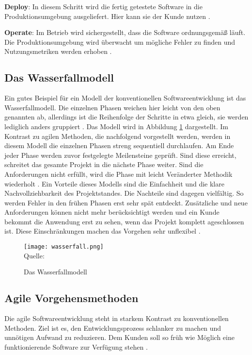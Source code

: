 \textbf{Deploy}: In diesem Schritt wird die fertig getestete Software in die Produktionsumgebung
ausgeliefert. Hier kann sie der Kunde nutzen \cite{Halstenberg2020}.

\textbf{Operate}: Im Betrieb wird sichergestellt, dass die Software ordnungsgemäß läuft.
Die Produktionsumgebung wird überwacht um mögliche Fehler zu finden und Nutzungsmetriken werden
erhoben \cite{Halstenberg2020}.

\subsection{Das Wasserfallmodell}

Ein gutes Beispiel für ein Modell der konventionellen Softwareentwicklung ist
das Wasserfallmodell. Die einzelnen Phasen weichen hier leicht von den oben genannten
ab, allerdings ist die Reihenfolge der Schritte in etwa gleich, sie werden lediglich
anders gruppiert \cite{DietmarAbts2017}. Das Modell wird in Abbildung \ref{fig:wasserfall} dargestellt.
Im Kontrast zu agilen Methoden, die nachfolgend vorgestellt werden, werden in diesem
Modell die einzelnen Phasen streng sequentiell durchlaufen. Am Ende jeder Phase werden 
zuvor festgelegte Meilensteine geprüft. Sind diese erreicht, schreitet das gesamte Projekt
in die nächste Phase weiter. Sind die Anforderungen nicht erfüllt, wird die Phase mit leicht
Veränderter Methodik wiederholt \cite{DietmarAbts2017}.
Ein Vorteile dieses Modells sind die Einfachheit und die klare Nachvollziehbarkeit
des Projektstandes.
Die Nachteile sind dagegen vielfältig. So werden Fehler in den frühen Phasen erst sehr
spät entdeckt. Zusätzliche und neue Anforderungen können nicht mehr berücksichtigt werden
und ein Kunde bekommt die Anwendung erst zu sehen, wenn das Projekt komplett ageschlossen ist.
Diese Einschränkungen machen das Vorgehen sehr unflexibel \cite{DietmarAbts2017}.

\begin{figure}[H]
    \centering
    \caption{Das Wasserfallmodell}
	\label{fig:wasserfall}
    \texttt{[image: wasserfall.png]}
    \\
    Quelle: \cite{DietmarAbts2017}
\end{figure}

\subsection{Agile Vorgehensmethoden}

Die agile Softwareentwicklung steht in starkem Kontrast zu konventionellen Methoden.
Ziel ist es, den Entwicklungsprozess schlanker zu machen und unnötigen Aufwand zu
reduzieren. Dem Kunden soll so früh wie Möglich eine funktionierende
Software zur Verfügung stehen \cite{DietmarAbts2017}.

